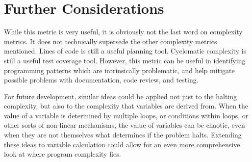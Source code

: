 \section{Further Considerations}

While this metric is very useful, it is obviously not the last word on complexity metrics.  It does not technically supersede the other complexity metrics mentioned.  Lines of code is still a useful planning tool.  Cyclomatic complexity is still a useful test coverage tool.  However, this metric can be useful in identifying programming patterns which are intrinsically problematic, and help mitigate possible problems with documentation, code review, and testing.  

For future development, similar ideas could be applied not just to the halting complexity, but also to the complexity that variables are derived from.  When the value of a variable is determined by multiple loops, or conditions within loops, or other sorts of non-linear mechanisms, the value of variables can be chaotic, even when they are not themselves what determines if the problem halts.  Extending these ideas to variable calculation could allow for an even more comprehensive look at where program complexity lies.



